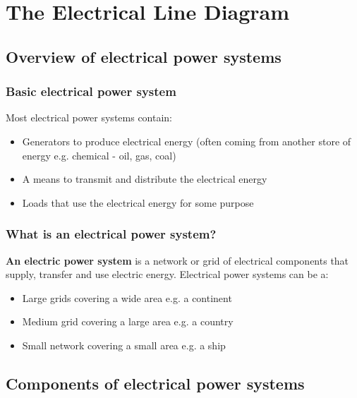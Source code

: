 \chapter{The Electrical Line Diagram}
\section{Overview of electrical power systems}
\subsection{Basic electrical power system}
Most electrical power systems contain:
\begin{itemize}
  \item Generators to produce electrical energy (often coming from another store of energy e.g. chemical - oil, gas, coal)
  \item A means to transmit and distribute the electrical energy
  \item Loads that use the electrical energy for some purpose
\end{itemize}
\subsection{What is an electrical power system?}
\textbf{An electric power system} is a network or grid of electrical components that supply, transfer and use electric energy. Electrical power systems can be a:
\begin{itemize}
  \item Large grids covering a wide area e.g. a continent
  \item Medium grid covering a large area e.g. a country
  \item Small network covering a small area e.g. a ship
\end{itemize}
\section{Components of electrical power systems}
